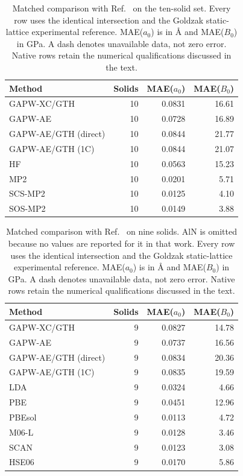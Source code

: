 \documentclass[10pt,a4paper]{article}
\begin{document}
\begin{table}[t]
\centering
\small
\caption{Matched comparison with Ref.~ on the ten-solid set. Every row uses the identical intersection and the Goldzak static-lattice experimental reference. MAE($a_0$) is in \AA{} and MAE($B_0$) in GPa. A dash denotes unavailable data, not zero error. Native rows retain the numerical qualifications discussed in the text.}
\label{tab:literature-Goldzak2022}
\begin{tabular}{lrrr}
\toprule
Method & Solids & MAE($a_0$) & MAE($B_0$) \\
\midrule
GAPW-XC/GTH & 10 & 0.0831 & 16.61 \\
GAPW-AE & 10 & 0.0728 & 16.89 \\
GAPW-AE/GTH (direct) & 10 & 0.0844 & 21.77 \\
GAPW-AE/GTH (1C) & 10 & 0.0844 & 21.07 \\
HF & 10 & 0.0563 & 15.23 \\
MP2 & 10 & 0.0201 & 5.71 \\
SCS-MP2 & 10 & 0.0125 & 4.10 \\
SOS-MP2 & 10 & 0.0149 & 3.88 \\
\bottomrule
\end{tabular}
\end{table}

\begin{table}[t]
\centering
\small
\caption{Matched comparison with Ref.~ on nine solids. AlN is omitted because no values are reported for it in that work. Every row uses the identical intersection and the Goldzak static-lattice experimental reference. MAE($a_0$) is in \AA{} and MAE($B_0$) in GPa. A dash denotes unavailable data, not zero error. Native rows retain the numerical qualifications discussed in the text.}
\label{tab:literature-Zhang2018}
\begin{tabular}{lrrr}
\toprule
Method & Solids & MAE($a_0$) & MAE($B_0$) \\
\midrule
GAPW-XC/GTH & 9 & 0.0827 & 14.78 \\
GAPW-AE & 9 & 0.0737 & 16.56 \\
GAPW-AE/GTH (direct) & 9 & 0.0834 & 20.36 \\
GAPW-AE/GTH (1C) & 9 & 0.0835 & 19.59 \\
LDA & 9 & 0.0324 & 4.66 \\
PBE & 9 & 0.0451 & 12.96 \\
PBEsol & 9 & 0.0113 & 4.72 \\
M06-L & 9 & 0.0128 & 3.46 \\
SCAN & 9 & 0.0123 & 3.08 \\
HSE06 & 9 & 0.0170 & 5.86 \\
\bottomrule
\end{tabular}
\end{table}
\end{document}

